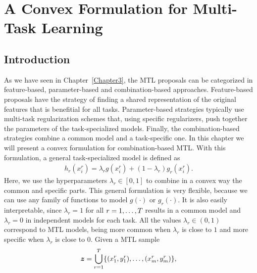 
\chapter{A Convex Formulation for Multi-Task Learning} %
\label{Chapter4}

{\bf \small{

}}

\section{Introduction}
As we have seen in Chapter~\ref{Chapter3}, the MTL proposals can be categorized in feature-based, parameter-based and combination-based approaches. Feature-based proposals have the strategy of finding a shared representation of the original features that is benefitial for all tasks. Parameter-based strategies typically use multi-task regularization schemes that, using specific regularizers, push together the parameters of the task-specialized models.
Finally, the combination-based strategies combine a common model and a task-specific one. 
%
In this chapter we will present a convex formulation for combination-based MTL. With this formulation, a general task-specialized model is defined as
\begin{equation}
    \label{eq:convexmtl_general}
    \begin{aligned}
        h_r(x_i^r)
       = \lambda_r g(x_i^r) + (1 - \lambda_r) g_r(x_i^r) .
    \end{aligned}    
\end{equation}
Here, we use the hyperparameters $\lambda_r \in [0, 1]$ to combine in a convex way the common and specific parts. This general formulation is very flexible, because we can use any family of functions to model $g(\cdot)$ or $g_r(\cdot)$. It is also easily interpretable, since $\lambda_r=1$ for all $r=1, \ldots, T$ results in a common model and $\lambda_r=0$ in independent models for each task. All the values $\lambda_r \in (0, 1)$ correspond to MTL models, being more common when $\lambda_r$ is close to $1$ and more specific when $\lambda_r$ is close to $0$.
%
Given a MTL sample 
$$\bm{z} = \bigcup_{r=1}^T \{(x_1^r, y_1^r), \ldots, (x_{m}^r, y_{m}^r)\},$$
